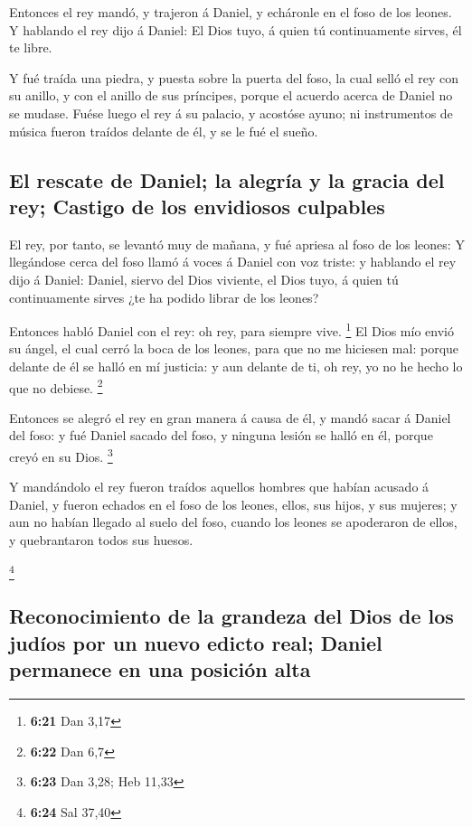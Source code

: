  Entonces el rey mandó, y trajeron á Daniel, y echáronle en
el foso de los leones. Y hablando el rey dijo á Daniel: El Dios tuyo, á
quien tú continuamente sirves, él te libre.

 Y fué traída una piedra, y puesta sobre la puerta del
foso, la cual selló el rey con su anillo, y con el anillo de sus
príncipes, porque el acuerdo acerca de Daniel no se mudase.
 Fuése luego el rey á su palacio, y acostóse ayuno; ni
instrumentos de música fueron traídos delante de él, y se le fué el
sueño.

\hypertarget{el-rescate-de-daniel-la-alegruxeda-y-la-gracia-del-rey-castigo-de-los-envidiosos-culpables}{%
\subsection{El rescate de Daniel; la alegría y la gracia del rey;
Castigo de los envidiosos
culpables}\label{el-rescate-de-daniel-la-alegruxeda-y-la-gracia-del-rey-castigo-de-los-envidiosos-culpables}}

 El rey, por tanto, se levantó muy de mañana, y fué apriesa
al foso de los leones:  Y llegándose cerca del foso llamó á
voces á Daniel con voz triste: y hablando el rey dijo á Daniel: Daniel,
siervo del Dios viviente, el Dios tuyo, á quien tú continuamente sirves
¿te ha podido librar de los leones?

 Entonces habló Daniel con el rey: oh rey, para siempre
vive. \footnote{\textbf{6:21} Dan 3,17}  El Dios mío envió
su ángel, el cual cerró la boca de los leones, para que no me hiciesen
mal: porque delante de él se halló en mí justicia: y aun delante de ti,
oh rey, yo no he hecho lo que no debiese. \footnote{\textbf{6:22} Dan
  6,7}

 Entonces se alegró el rey en gran manera á causa de él, y
mandó sacar á Daniel del foso: y fué Daniel sacado del foso, y ninguna
lesión se halló en él, porque creyó en su Dios. \footnote{\textbf{6:23}
  Dan 3,28; Heb 11,33}

 Y mandándolo el rey fueron traídos aquellos hombres que
habían acusado á Daniel, y fueron echados en el foso de los leones,
ellos, sus hijos, y sus mujeres; y aun no habían llegado al suelo del
foso, cuando los leones se apoderaron de ellos, y quebrantaron todos sus
huesos.

\footnote{\textbf{6:24} Sal 37,40}

\hypertarget{reconocimiento-de-la-grandeza-del-dios-de-los-juduxedos-por-un-nuevo-edicto-real-daniel-permanece-en-una-posiciuxf3n-alta}{%
\subsection{Reconocimiento de la grandeza del Dios de los judíos por un
nuevo edicto real; Daniel permanece en una posición
alta}\label{reconocimiento-de-la-grandeza-del-dios-de-los-juduxedos-por-un-nuevo-edicto-real-daniel-permanece-en-una-posiciuxf3n-alta}}

